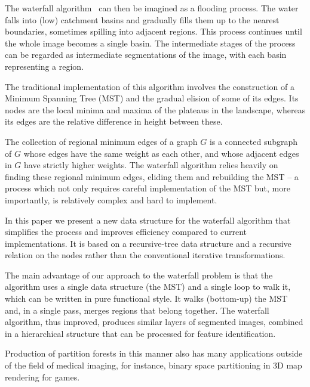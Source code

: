 \documentclass[12pt]{ouclprgsc}
\begin{document}
The waterfall algorithm~\cite{beucher,marcotegui} can then be imagined
as a flooding process. The water falls into (low) catchment basins and
gradually fills them up to the nearest boundaries, sometimes spilling
into adjacent regions. This process continues until the whole image
becomes a single basin. The intermediate stages of the process can be
regarded as intermediate segmentations of the image, with each basin
representing a region.

The traditional implementation of this algorithm \cite{marcotegui}
involves the construction of a Minimum Spanning Tree (MST) and the
gradual elision of some of its edges. Its nodes are the local minima
and maxima of the plateaus in the landscape, whereas its edges are the
relative difference in height between these.

The collection of regional minimum edges of a graph $G$ is a connected
subgraph of $G$ whose edges have the same weight as each other, and
whose adjacent edges in $G$ have strictly higher weights. The
waterfall algorithm relies heavily on finding these regional minimum
edges, eliding them and rebuilding the MST -- a process which not only
requires careful implementation of the MST but, more importantly, is
relatively complex and hard to implement.

In this paper we present a new data structure for the waterfall
algorithm that simplifies the process and improves efficiency compared
to current implementations. It is based on a recursive-tree data
structure and a recursive relation on the nodes rather than the
conventional iterative transformations.

The main advantage of our approach to the waterfall problem is that
the algorithm uses a single data structure (the MST) and a single loop
to walk it, which can be written in pure functional style. It walks
(bottom-up) the MST and, in a single pass, merges regions that belong
together.  The waterfall algorithm, thus improved, produces similar
layers of segmented images, combined in a hierarchical structure that
can be processed for feature identification.

Production of partition forests in this manner also has many
applications outside of the field of medical imaging, for instance,
binary space partitioning in 3D map rendering for games.



\begin{thebibliography}{2}



\end{thebibliography}
\end{document}
